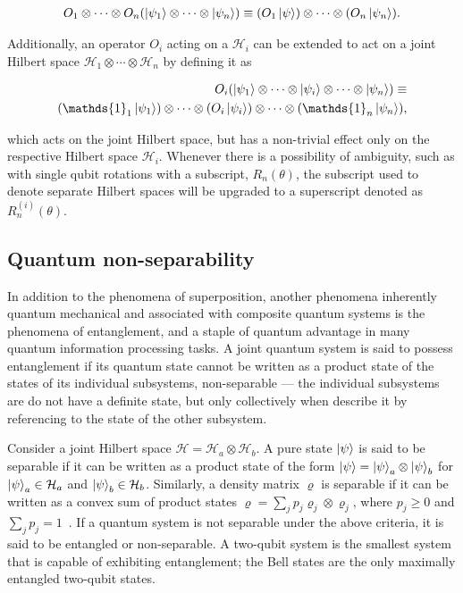 \begin{align}
	O_1 \otimes \cdots \otimes O_n (\ket{\psi_1} \otimes \cdots \otimes \ket{\psi_n}) \equiv (O_1\ket{\psi})\otimes \cdots \otimes(O_n\ket{\psi_n}).
\end{align}


\clearpage
\noindent
Additionally, an operator $O_i$ acting on a $\mathcal{H}_i$ can be extended to act on a joint Hilbert space $\mathcal{H}_1\otimes \cdots \otimes\mathcal{H}_n$ by defining it as 

\begin{align}
	O_i(\ket{\psi_1}\otimes\cdots\otimes\ket{\psi_i}\otimes\cdots\otimes\ket{\psi_n}) \equiv \nonumber \\ (\mathds{1}_1\ket{\psi_1})\otimes\cdots\otimes (O_i\ket{\psi_i})\otimes\cdots\otimes(\mathds{1}_n\ket{\psi_n}), 
\end{align}

\noindent
which acts on the joint Hilbert space, but has a non-trivial effect only on the respective Hilbert space $\mathcal{H}_i$. Whenever there is a possibility of ambiguity, such as with single qubit rotations with a subscript, \ie $R_{n}(\theta)$, the subscript used to denote separate Hilbert spaces will be upgraded to a superscript denoted as $R^{(i)}_{n}(\theta)$.

\subsection{Quantum non-separability}
\noindent
In addition to the phenomena of superposition, another phenomena inherently quantum mechanical and associated with composite quantum systems is the phenomena of entanglement, and a staple of quantum advantage in many quantum information processing tasks. A joint quantum system is said to possess entanglement if its quantum state cannot be written as a product state of the states of its individual subsystems, \ie non-separable --- the individual subsystems are do not have a definite state, but only collectively when describe it by referencing to the state of the other subsystem. 

\bigskip
\noindent
Consider a joint Hilbert space $\mathcal{H} = \mathcal{H}_a \otimes \mathcal{H}_b$. A pure state $\ket{\psi}$ is said to be separable if it can be written as a product state of the form $\ket{\psi} = \ket{\psi}_a \otimes \ket{\psi}_b$ for $\ket{\psi}_a \in \mathcal{H}_a$ and $\ket{\psi}_b \in \mathcal{H}_b$. Similarly, a density matrix $\varrho$ is separable if it can be written as a convex sum of product states $\varrho = \sum_{j} p_j \varrho_j \otimes \varrho_j$, where $p_j \geq 0$ and $\sum_{j} p_j = 1$~\cite{Peres_1996}. If a quantum system is not separable under the above criteria, it is said to be entangled or non-separable. A two-qubit system is the smallest system that is capable of exhibiting entanglement; the Bell states are the only maximally entangled two-qubit states.

